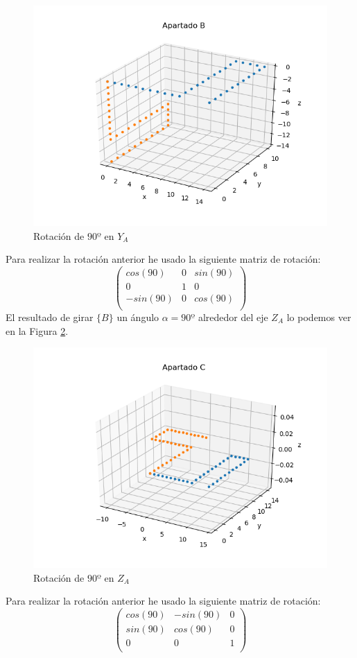 \documentclass[12pt,a4paper]{report}
\begin{document}
\begin{figure}[H]
	\centering
	\includegraphics[width=0.7\linewidth]{img/eje1_b.png}
	\caption{Rotación de $90º$ en $Y_A$}
	\label{fig:eje1_b}
\end{figure}
Para realizar la rotación anterior he usado la siguiente matriz de rotación:
$$
\begin{pmatrix} 
		cos(90) & 0 & sin(90) \\  
		0 & 1 & 0 \\  
		-sin(90)& 0 & cos(90) \\  
\end{pmatrix}
$$
El resultado de girar $\{B\}$ un ángulo $\alpha=90º$ alrededor del eje $Z_A$ lo podemos ver en la Figura \ref{fig:eje1_c}.
\begin{figure}[H]
	\centering
	\includegraphics[width=0.7\linewidth]{img/eje1_c.png}
	\caption{Rotación de $90º$ en $Z_A$}
	\label{fig:eje1_c}
\end{figure}
Para realizar la rotación anterior he usado la siguiente matriz de rotación:
$$
\begin{pmatrix} 
		cos(90) & -sin(90) & 0 \\  
		sin(90) & cos(90) & 0 \\  
		0& 0 & 1 \\  
\end{pmatrix}
$$
\end{document}
